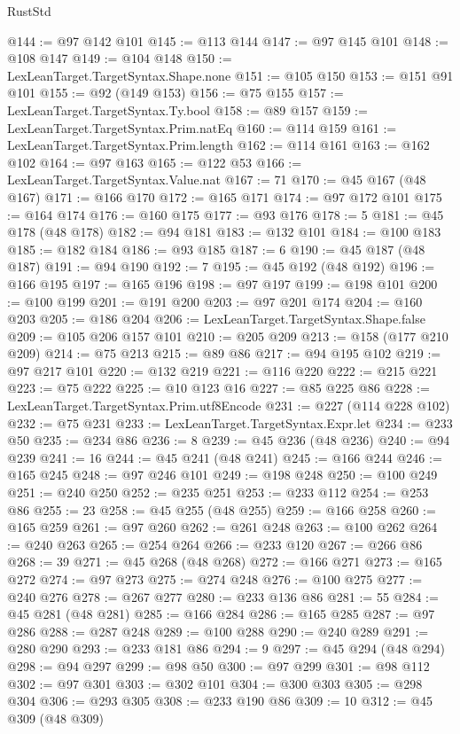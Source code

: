 \begin{lexlean}{RustStd}
\begin{coremodule}
@144 := @97 @142 @101
@145 := @113 @144
@147 := @97 @145 @101
@148 := @108 @147
@149 := @104 @148
@150 := LexLeanTarget.TargetSyntax.Shape.none
@151 := @105 @150
@153 := @151 @91 @101
@155 := @92 (@149 @153)
@156 := @75 @155
@157 := LexLeanTarget.TargetSyntax.Ty.bool
@158 := @89 @157
@159 := LexLeanTarget.TargetSyntax.Prim.natEq
@160 := @114 @159
@161 := LexLeanTarget.TargetSyntax.Prim.length
@162 := @114 @161
@163 := @162 @102
@164 := @97 @163
@165 := @122 @53
@166 := LexLeanTarget.TargetSyntax.Value.nat
@167 := 71
@170 := @45 @167 (@48 @167)
@171 := @166 @170
@172 := @165 @171
@174 := @97 @172 @101
@175 := @164 @174
@176 := @160 @175
@177 := @93 @176
@178 := 5
@181 := @45 @178 (@48 @178)
@182 := @94 @181
@183 := @132 @101
@184 := @100 @183
@185 := @182 @184
@186 := @93 @185
@187 := 6
@190 := @45 @187 (@48 @187)
@191 := @94 @190
@192 := 7
@195 := @45 @192 (@48 @192)
@196 := @166 @195
@197 := @165 @196
@198 := @97 @197
@199 := @198 @101
@200 := @100 @199
@201 := @191 @200
@203 := @97 @201 @174
@204 := @160 @203
@205 := @186 @204
@206 := LexLeanTarget.TargetSyntax.Shape.false
@209 := @105 @206 @157 @101
@210 := @205 @209
@213 := @158 (@177 @210 @209)
@214 := @75 @213
@215 := @89 @86
@217 := @94 @195 @102
@219 := @97 @217 @101
@220 := @132 @219
@221 := @116 @220
@222 := @215 @221
@223 := @75 @222
@225 := @10 @123 @16
@227 := @85 @225 @86
@228 := LexLeanTarget.TargetSyntax.Prim.utf8Encode
@231 := @227 (@114 @228 @102)
@232 := @75 @231
@233 := LexLeanTarget.TargetSyntax.Expr.let
@234 := @233 @50
@235 := @234 @86
@236 := 8
@239 := @45 @236 (@48 @236)
@240 := @94 @239
@241 := 16
@244 := @45 @241 (@48 @241)
@245 := @166 @244
@246 := @165 @245
@248 := @97 @246 @101
@249 := @198 @248
@250 := @100 @249
@251 := @240 @250
@252 := @235 @251
@253 := @233 @112
@254 := @253 @86
@255 := 23
@258 := @45 @255 (@48 @255)
@259 := @166 @258
@260 := @165 @259
@261 := @97 @260
@262 := @261 @248
@263 := @100 @262
@264 := @240 @263
@265 := @254 @264
@266 := @233 @120
@267 := @266 @86
@268 := 39
@271 := @45 @268 (@48 @268)
@272 := @166 @271
@273 := @165 @272
@274 := @97 @273
@275 := @274 @248
@276 := @100 @275
@277 := @240 @276
@278 := @267 @277
@280 := @233 @136 @86
@281 := 55
@284 := @45 @281 (@48 @281)
@285 := @166 @284
@286 := @165 @285
@287 := @97 @286
@288 := @287 @248
@289 := @100 @288
@290 := @240 @289
@291 := @280 @290
@293 := @233 @181 @86
@294 := 9
@297 := @45 @294 (@48 @294)
@298 := @94 @297
@299 := @98 @50
@300 := @97 @299
@301 := @98 @112
@302 := @97 @301
@303 := @302 @101
@304 := @300 @303
@305 := @298 @304
@306 := @293 @305
@308 := @233 @190 @86
@309 := 10
@312 := @45 @309 (@48 @309)

\end{coremodule}
\end{lexlean}
